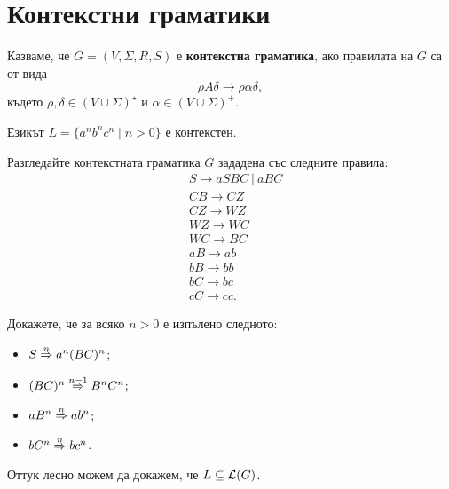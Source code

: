 \section{Контекстни граматики}
Казваме, че $G = (V,\Sigma,R,S)$ е {\bf контекстна граматика}, ако правилата на $G$ са от вида
\[\rho A \delta \to \rho \alpha \delta,\]
където $\rho,\delta \in (V\cup\Sigma)^\star$ и $\alpha \in (V\cup\Sigma)^+$.

\begin{example}
  Езикът $L = \{a^nb^nc^n \mid n > 0\}$ е контекстен.
\end{example}
\begin{hint}
  Разгледайте контекстната граматика $G$ зададена със следните правила:
  \begin{align*}
    & S \to aSBC\ |\ aBC\\
    & CB \to CZ\\
    & CZ \to WZ\\
    & WZ \to WC\\
    & WC \to BC\\
    & aB \to ab\\
    & bB \to bb\\
    & bC \to bc\\
    & cC \to cc.
  \end{align*}

  Докажете, че за всяко $n > 0$ е изпълено следното:
  \begin{itemize}
  \item
    $S \stackrel{{n}}{\Rightarrow} a^n(BC)^n$;
  \item
    $(BC)^n \stackrel{{n-1}}{\Rightarrow} B^nC^n$;
  \item
    $aB^n \stackrel{{n}}{\Rightarrow} ab^n$;
  \item
    $bC^n \stackrel{{n}}{\Rightarrow} bc^n$.
  \end{itemize}
  Оттук лесно можем да докажем, че $L \subseteq \mathcal{L}(G)$.
\end{hint}

